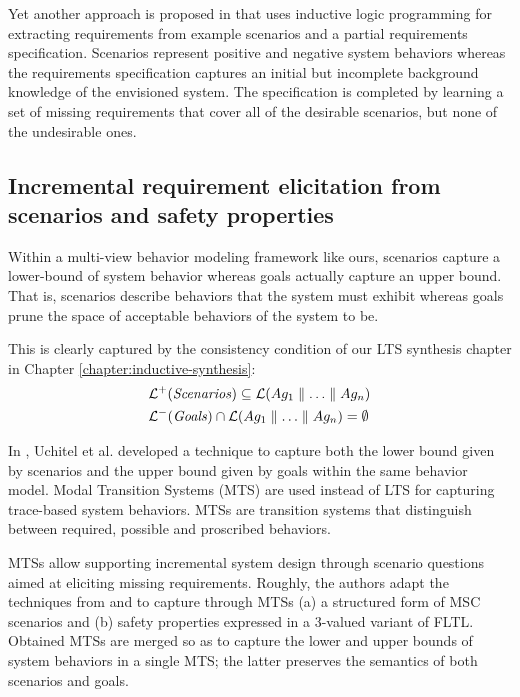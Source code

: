 Yet another approach is proposed in \cite{Alrajeh:2007} that uses inductive logic programming for extracting requirements from example scenarios and a partial requirements specification. Scenarios represent positive and negative system behaviors whereas the requirements specification captures an initial but incomplete background knowledge of the envisioned system. The specification is completed by learning a set of missing requirements that cover all of the desirable scenarios, but none of the undesirable ones.

\subsection{Incremental requirement elicitation from scenarios and safety properties\label{related-for-requirements-2}}

Within a multi-view behavior modeling framework like ours, scenarios capture a lower-bound of system behavior whereas goals actually capture an upper bound. That is, scenarios describe behaviors that the system must exhibit whereas goals prune the space of acceptable behaviors of the system to be. 

This is clearly captured by the consistency condition of our LTS synthesis chapter in Chapter \ref{chapter:inductive-synthesis}:
\begin{align*}
&\mathcal{L}^+(\mbox{\emph{Scenarios}}) \subseteq \mathcal{L}(Ag_1 \parallel \ldots \parallel Ag_n) \\
&\mathcal{L}^-(\mbox{\emph{Goals}}) \cap \mathcal{L}(Ag_1 \parallel \ldots \parallel Ag_n) = \emptyset
\end{align*}

In \cite{Uchitel:2007, Uchitel:2009}, Uchitel et al. developed a technique to capture both the lower bound given by scenarios and the upper bound given by goals within the same behavior model. Modal Transition Systems (MTS) \cite{Larsen:1988} are used instead of LTS for capturing trace-based system behaviors. MTSs are transition systems that distinguish between required, possible and proscribed behaviors. 

MTSs allow supporting incremental system design through scenario questions aimed at eliciting missing requirements. Roughly, the authors adapt the techniques from \cite{Uchitel:2003} and \cite{Giannakopoulou:2003} to capture through MTSs (a) a structured form of MSC scenarios and (b) safety properties expressed in a 3-valued variant of FLTL. Obtained MTSs are merged so as to capture the lower and upper bounds of system behaviors in a single MTS; the latter preserves the semantics of both scenarios and goals. 


